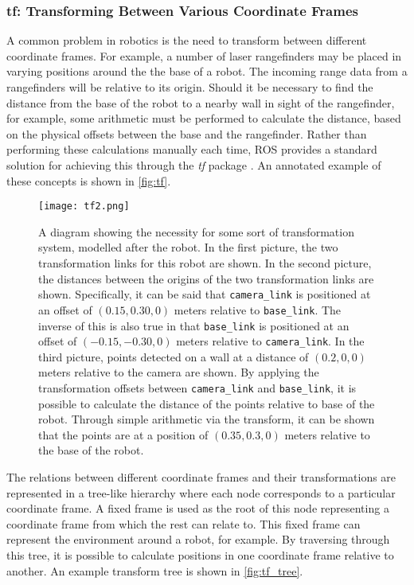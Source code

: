 \subsubsection{tf: Transforming Between Various Coordinate Frames}
A common problem in robotics is the need to transform between different coordinate frames. For example, a number of laser rangefinders may be placed in varying positions around the the base of a robot. The incoming range data from a rangefinders will be relative to its origin. Should it be necessary to find the distance from the base of the robot to a nearby wall in sight of the rangefinder, for example, some arithmetic must be performed to calculate the distance, based on the physical offsets between the base and the rangefinder. Rather than performing these calculations manually each time, ROS provides a standard solution for achieving this through the \emph{tf} package \cite{ros_wiki_tf}. An annotated example of these concepts is shown in \autoref{fig:tf}.

\begin{figure}[!h]
    \centering
    \texttt{[image: tf2.png]}
    \caption{A diagram showing the necessity for some sort of transformation system, modelled after the robot. In the first picture, the two transformation links for this robot are shown. In the second picture, the distances between the origins of the two transformation links are shown. Specifically, it can be said that \texttt{camera\_link} is positioned at an offset of $(0.15, 0.30, 0)$ meters relative to \texttt{base\_link}. The inverse of this is also true in that \texttt{base\_link} is positioned at an offset of $(-0.15, -0.30, 0)$ meters relative to \texttt{camera\_link}. In the third picture, points detected on a wall at a distance of $(0.2, 0, 0)$ meters relative to the camera are shown. By applying the transformation offsets between \texttt{camera\_link} and \texttt{base\_link}, it is possible to calculate the distance of the points relative to base of the robot. Through simple arithmetic via the transform, it can be shown that the points are at a position of $(0.35, 0.3, 0)$ meters relative to the base of the robot.}
    \label{fig:tf}
\end{figure}

The relations between different coordinate frames and their transformations are represented in a tree-like hierarchy where each node corresponds to a particular coordinate frame. A fixed frame is used as the root of this node representing a coordinate frame from which the rest can relate to. This fixed frame can represent the environment around a robot, for example. By traversing through this tree, it is possible to calculate positions in one coordinate frame relative to another. An example transform tree is shown in \autoref{fig:tf_tree}.

